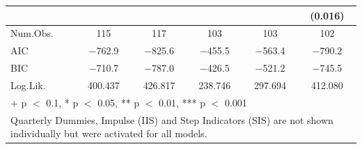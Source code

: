 \begin{table}
{\begin{tabular}[t]{lccccc}
 &  &  &  &  & (\num{0.016})\\
\midrule
Num.Obs. & \num{115} & \num{117} & \num{103} & \num{103} & \num{102}\\
AIC & \num{-762.9} & \num{-825.6} & \num{-455.5} & \num{-563.4} & \num{-790.2}\\
BIC & \num{-710.7} & \num{-787.0} & \num{-426.5} & \num{-521.2} & \num{-745.5}\\
Log.Lik. & \num{400.437} & \num{426.817} & \num{238.746} & \num{297.694} & \num{412.080}\\
\bottomrule
\multicolumn{6}{l}{\rule{0pt}{1em}+ p $<$ 0.1, * p $<$ 0.05, ** p $<$ 0.01, *** p $<$ 0.001}\\
\multicolumn{6}{l}{\rule{0pt}{1em}Quarterly Dummies, Impulse (IIS) and Step Indicators (SIS) are not shown individually but were activated for all models.}\\
\end{tabular}}
\end{table}

